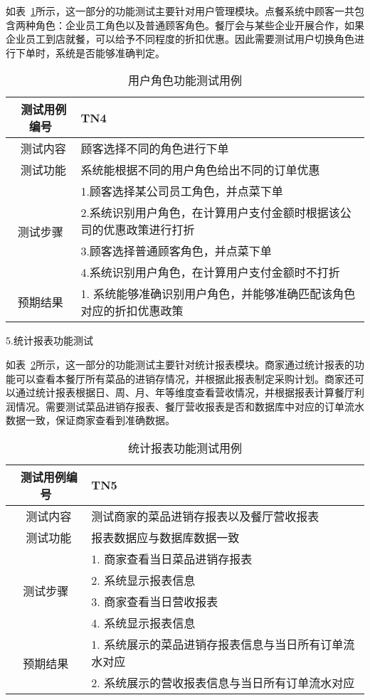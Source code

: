 如表~\ref{table:tn4}所示，这一部分的功能测试主要针对用户管理模块。点餐系统中顾客一共包含两种角色：企业员工角色以及普通顾客角色。餐厅会与某些企业开展合作，如果企业员工到店就餐，可以给予不同程度的折扣优惠。因此需要测试用户切换角色进行下单时，系统是否能够准确判定。
\begin{table}[htbp!]
    \footnotesize
    \centering
    \caption{用户角色功能测试用例}
    \vspace{2mm}
    \begin{tabular}{cp{11.5cm}}
     \hline
     \ 测试用例编号 & TN4 \\ 
     \hline
     \ 测试内容 & 顾客选择不同的角色进行下单 \\ 
     \hline
     \ 测试功能 & 系统能根据不同的用户角色给出不同的订单优惠 \\ 
     \hline
     \multirow{4}{*}{测试步骤}
      & 1.顾客选择某公司员工角色，并点菜下单\\
      & 2.系统识别用户角色，在计算用户支付金额时根据该公司的优惠政策进行打折 \\
      & 3.顾客选择普通顾客角色，并点菜下单 \\
      & 4.系统识别用户角色，在计算用户支付金额时不打折\\
      \hline
     \multirow{1}{*}{预期结果}
      & 1. 系统能够准确识别用户角色，并能够准确匹配该角色对应的折扣优惠政策\\
    \hline
    \end{tabular}   
    \label{table:tn4}
\end{table}

5.统计报表功能测试

如表~\ref{table:tn5}所示，这一部分的功能测试主要针对统计报表模块。商家通过统计报表的功能可以查看本餐厅所有菜品的进销存情况，并根据此报表制定采购计划。商家还可以通过统计报表根据日、周、月、年等维度查看营收情况，并根据报表计算餐厅利润情况。需要测试菜品进销存报表、餐厅营收报表是否和数据库中对应的订单流水数据一致，保证商家查看到准确数据。

\begin{table}[htbp!]
    \footnotesize
    \centering
    \caption{统计报表功能测试用例}
    \vspace{2mm}
    \begin{tabular}{cp{11.5cm}}
     \hline
     \ 测试用例编号 & TN5 \\ 
     \hline
     \ 测试内容 & 测试商家的菜品进销存报表以及餐厅营收报表 \\ 
     \hline
     \ 测试功能 & 报表数据应与数据库数据一致 \\ 
     \hline
     \multirow{4}{*}{测试步骤}
      & 1. 商家查看当日菜品进销存报表\\
      & 2. 系统显示报表信息 \\
      & 3. 商家查看当日营收报表 \\
      & 4. 系统显示报表信息\\
      \hline
     \multirow{2}{*}{预期结果}
      & 1. 系统展示的菜品进销存报表信息与当日所有订单流水对应\\
      & 2. 系统展示的营收报表信息与当日所有订单流水对应\\
    \hline
    \end{tabular}   
    \label{table:tn5}
\end{table}

